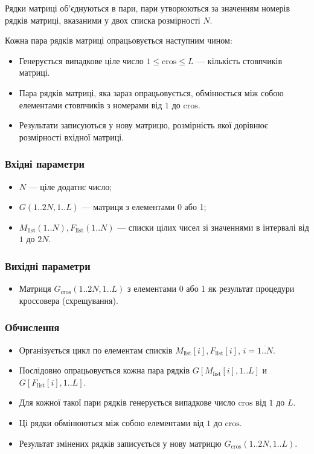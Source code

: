 \documentclass[a4paper, 12pt]{article}
\numberwithin{equation}{section}
\begin{document}
Рядки матриці об'єднуються в пари, пари утворюються за значенням номерів рядків матриці, вказаними у двох списка розмірності $N$. \medskip

Кожна пара рядків матриці опрацьовується наступним чином:
\begin{itemize}
    \item Генерується випадкове ціле число $1 \le \text{cros} \le L$ --- кількість стовпчиків матриці. 
    \item Пара рядків матриці, яка зараз опрацьовується, обмінюється між собою елементами стовпчиків з номерами від $1$ до $\text{cros}$. 
    \item Результати записуються у нову матрицю, розмірність якої дорівнює розмірності вхідної матриці.
\end{itemize}

\subsubsection*{Вхідні параметри}

\begin{itemize}
    \item $N$ --- ціле додатнє число;
    \item $G(1..2N,1..L)$ --- матриця з елементами 0 або 1;
    \item $M_{\text{list}}(1..N), F_{\text{list}}(1..N)$ --- списки цілих чисел зі значеннями в інтервалі від $1$ до $2N$.
\end{itemize}

\subsubsection*{Вихідні параметри}

\begin{itemize}
    \item Матриця $G_{\text{cros}}(1..2N,1..L)$ з елементами 0 або 1 як результат процедури кроссовера (схрещування).
\end{itemize}

\subsubsection*{Обчислення}

\begin{itemize}
    \item Організується цикл по елементам списків $M_{\text{list}}[i], F_{\text{list}}[i]$, $i = \overline{1..N}$. 
    \item Послідовно опрацьовується кожна пара рядків $G[M_{\text{list}}[i],1..L]$ и $G[F_{\text{list}}[i],1..L]$. 
    \item Для кожної такої пари рядків генерується випадкове число $\text{cros}$ від $1$ до $L$. 
    \item Ці рядки обмінюються між собою елементами від $1$ до $\text{cros}$. 
    \item Результат змінених рядків записується у нову матрицю $G_{\text{cros}}(1..2N,1..L)$.
\end{itemize}
\end{document}
